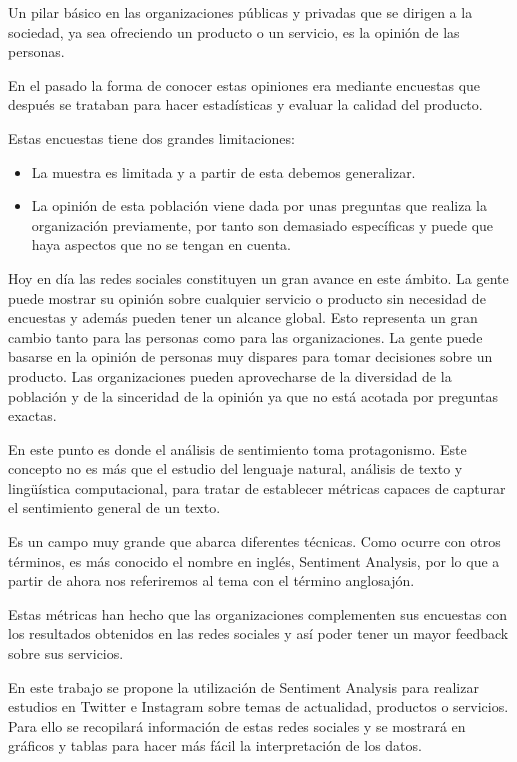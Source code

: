 
Un pilar básico en las organizaciones públicas y privadas que se dirigen a la sociedad, ya sea ofreciendo un producto o un servicio, es la opinión de las personas. 

En el pasado la forma de conocer estas opiniones era mediante encuestas que después se trataban para hacer estadísticas y evaluar la calidad del producto.

Estas encuestas tiene dos grandes limitaciones:
\begin{itemize}
\tightlist
    \item La muestra es limitada y a partir de esta debemos generalizar.
    \item La opinión de esta población viene dada por unas preguntas que realiza la organización previamente, por tanto son demasiado específicas y puede que haya aspectos que no se tengan en cuenta.
\end{itemize}

Hoy en día las redes sociales constituyen un gran avance en este ámbito. La gente puede mostrar su opinión sobre cualquier servicio o producto sin necesidad de encuestas y además pueden tener un alcance global.
Esto representa un gran cambio tanto para las personas como para las organizaciones. La gente puede basarse en la opinión de personas muy dispares para tomar decisiones sobre un producto. Las organizaciones pueden aprovecharse de la diversidad de la población y de la sinceridad de la opinión ya que no está acotada por preguntas exactas.

En este punto es donde el análisis de sentimiento toma protagonismo. Este concepto no es más que el estudio del lenguaje natural, análisis de texto y lingüística computacional, para tratar de establecer métricas capaces de capturar el sentimiento general de un texto. 

Es un campo muy grande que abarca diferentes técnicas. Como ocurre con otros términos, es más conocido el nombre en inglés, Sentiment Analysis, por lo que a partir de ahora nos referiremos al tema con el término anglosajón.

Estas métricas han hecho que las organizaciones complementen sus encuestas con los resultados obtenidos en las redes sociales y así poder tener un mayor feedback sobre sus servicios. 

En este trabajo se propone la utilización de Sentiment Analysis para realizar estudios en Twitter e Instagram sobre temas de actualidad, productos o servicios. 
Para ello se recopilará información de estas redes sociales y se mostrará en gráficos y tablas para hacer más fácil la interpretación de los datos.



